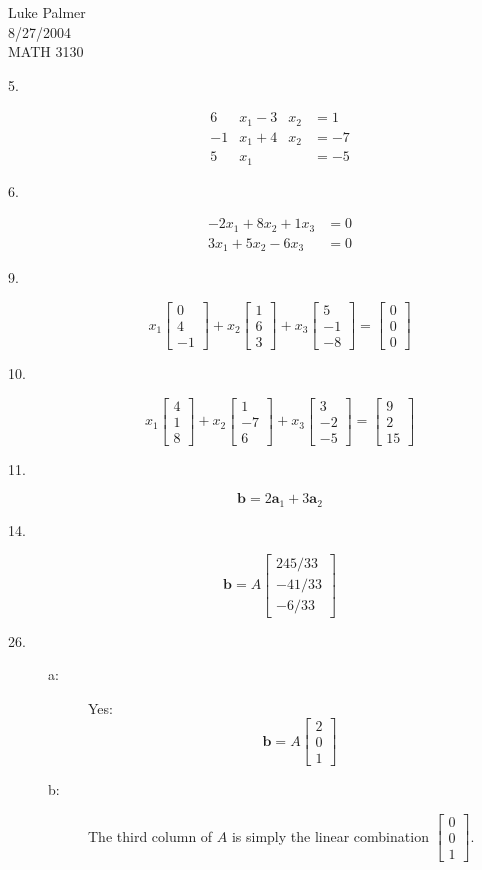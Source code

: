 \documentclass[12pt]{article}
\newcommand{\vv}[1]{\begin{bmatrix}#1\end{bmatrix}}
\begin{document}
\noindent Luke Palmer \\
8/27/2004 \\ 
MATH 3130

\begin{description}
\item[5.]
  \begin{alignat*}
    6&x_1 - 3&x_2 &= 1 \\
   -1&x_1 + 4&x_2 &= -7 \\
    5&x_1    &    &= -5
  \end{alignat*}

\item[6.]
  \begin{align*}
     -2 x_1 + 8 x_2 + 1 x_3 &= 0 \\
     3 x_1 + 5 x_2 - 6 x_3 &= 0
  \end{align*}


\item[9.] \[
  x_1 \vv{0 \\ 4 \\ -1} +
  x_2 \vv{1 \\ 6 \\ 3} +
  x_3 \vv{5 \\-1 \\ -8} =
      \vv{0 \\ 0 \\ 0}
\]

\item[10.] \[
  x_1 \vv{4 \\ 1 \\ 8} +
  x_2 \vv{1 \\ -7 \\ 6} +
  x_3 \vv{3 \\ -2 \\ -5} =
      \vv{9 \\ 2 \\ 15}
\]

\item[11.] \[
  \mathbf{b} = 2\mathbf{a}_1 + 3\mathbf{a}_2
\]

\item[14.] \[
  \mathbf{b} = A \vv{245/33 \\ -41/33 \\ -6/33}
\]

\item[26.] 
  \begin{description}
    \item[a:] Yes: \[
      \mathbf{b} = A \vv{2 \\ 0 \\ 1}
    \]
    \item[b:] The third column of $A$ is simply the linear combination
    $\vv{0\\0\\1}$. 
  \end{description}

\end{description}
\end{document}
